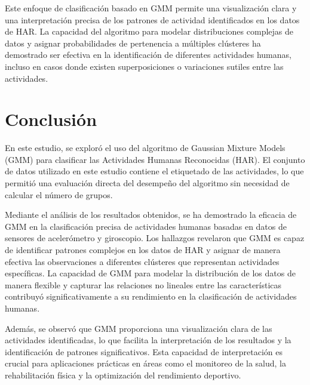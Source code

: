 \documentclass{esannV2}
\begin{document}
Este enfoque de clasificación basado en GMM permite una visualización clara y una interpretación precisa de los patrones de actividad identificados en los datos de HAR. La capacidad del algoritmo para modelar distribuciones complejas de datos y asignar probabilidades de pertenencia a múltiples clústeres ha demostrado ser efectiva en la identificación de diferentes actividades humanas, incluso en casos donde existen superposiciones o variaciones sutiles entre las actividades.

\section{Conclusión}
En este estudio, se exploró el uso del algoritmo de Gaussian Mixture Models (GMM) para clasificar las Actividades Humanas Reconocidas (HAR). El conjunto de datos utilizado en este estudio contiene el etiquetado de las actividades, lo que permitió una evaluación directa del desempeño del algoritmo sin necesidad de calcular el número de grupos.

Mediante el análisis de los resultados obtenidos, se ha demostrado la eficacia de GMM en la clasificación precisa de actividades humanas basadas en datos de sensores de acelerómetro y giroscopio. Los hallazgos revelaron que GMM es capaz de identificar patrones complejos en los datos de HAR y asignar de manera efectiva las observaciones a diferentes clústeres que representan actividades específicas. La capacidad de GMM para modelar la distribución de los datos de manera flexible y capturar las relaciones no lineales entre las características contribuyó significativamente a su rendimiento en la clasificación de actividades humanas.

Además, se observó que GMM proporciona una visualización clara de las actividades identificadas, lo que facilita la interpretación de los resultados y la identificación de patrones significativos. Esta capacidad de interpretación es crucial para aplicaciones prácticas en áreas como el monitoreo de la salud, la rehabilitación física y la optimización del rendimiento deportivo.




\begin{footnotesize}









%
%

\end{footnotesize}

\end{document}
